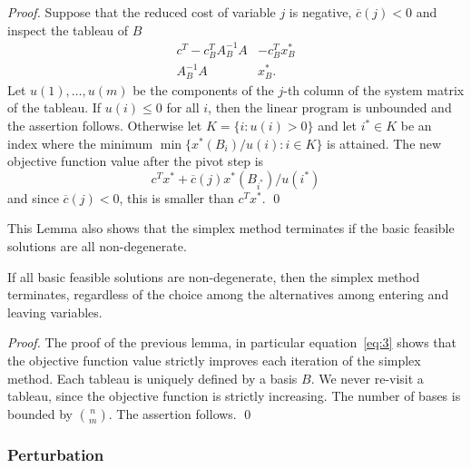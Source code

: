 \begin{proof}
  Suppose that the reduced cost of variable $j$ is negative, 
  $\overline{c}(j)<0$ and inspect the tableau of $B$ 
  \begin{displaymath}
    \begin{array}{c|c}
      c^T - c_B^TA_B^{-1}A & -c_B^Tx^*_B \\ \hline 
      A_B^{-1}A        & x^*_B.
    \end{array}
  \end{displaymath}
Let $u(1),\ldots,u(m)$ be the components of the $j$-th column of the
system matrix of the tableau. If $u(i)\leq0$ for all $i$, then the linear program is
unbounded and the assertion follows. Otherwise let $K = \{ i \colon u(i) >
0\}$ and let $i^*\in K$ be an index where the minimum 
$\min \{x^*(B_i)/u(i) \colon i \in K\}$ is attained. The new objective
function value after the pivot step is 
\begin{equation}
  \label{eq:3}
  c^Tx^* + \overline{c}(j) x^*(B_{i^*})/u(i^*)
\end{equation}
and since $\overline{c}(j)<0$, this is smaller than $c^Tx^*$. \qed
  
\end{proof}



This Lemma also shows that the simplex method terminates if the basic
feasible solutions are all non-degenerate. 

\begin{theorem}
  \label{thr:2}
  If all basic feasible solutions are non-degenerate, then the simplex
  method terminates, regardless of the choice among the alternatives
  among entering and leaving variables. 
\end{theorem}


\begin{proof}
  The proof of the previous lemma, in particular equation~\eqref{eq:3}
  shows that  the objective function value strictly improves each
  iteration of the simplex method. Each tableau is uniquely defined by
  a basis $B$. We never re-visit a tableau, since the objective
  function is strictly increasing. The number of bases is bounded by
  $\binom{n}{m}$. The assertion follows. \qed
\end{proof}




\subsubsection*{Perturbation}

